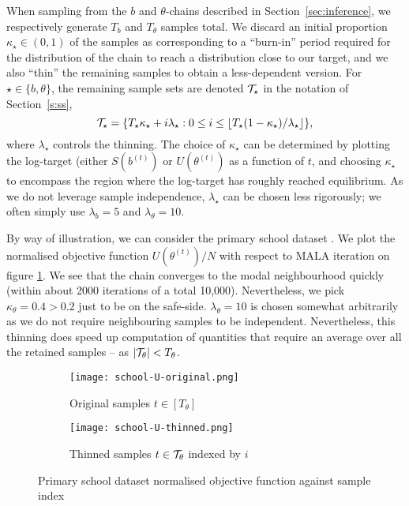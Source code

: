 When sampling from the $b$ and $\theta$-chains described
in Section~\ref{sec:inference}, we respectively generate
$T_b$ and $T_\theta$ samples total.
We discard an initial proportion $\kappa_\star\in(0,1)$ of the samples 
as corresponding to a ``burn-in'' period required for the distribution 
of the chain to reach a distribution close to our target,
and we also ``thin'' the remaining samples to 
obtain a less-dependent version. For $\star\in\{b,\theta\}$,
the remaining sample sets are denoted $\mathcal{T}_\star$
in the notation of Section~\ref{s:ss},
%
\begin{equation}
	\mathcal{T}_\star = \{T_\star \kappa_\star + i \lambda_\star :  
	0 \leq i \leq \lfloor T_\star(1 - \kappa_\star) / \lambda_\star \rfloor \},
\end{equation}
%
where $\lambda_\star$ controls the thinning. The choice of
$\kappa_\star$ can be determined by plotting the log-target (either $S(b^{(t)})$ 
or $U(\theta^{(t)})$ as a function of $t$,
and choosing $\kappa_\star$ to encompass the region where the log-target has 
roughly reached equilibrium. As we do not leverage sample independence,
$\lambda_\star$ can be chosen less rigorously; we often simply
use $\lambda_b=5$ and $\lambda_\theta = 10$.

By way of illustration, we can consider the primary school dataset \cite{schools}. We plot the normalised objective function $U\left( \theta^{(t)} \right) / N$ with respect to MALA iteration on figure \ref{fig:school-U-orginal}. We see that the chain converges to the modal neighbourhood quickly (within about 2000 iterations of a total 10,000). Nevertheless, we pick $\kappa_\theta=0.4 > 0.2$ just to be on the safe-side. $\lambda_\theta=10$ is chosen somewhat arbitrarily as we do not require neighbouring samples to be independent. Nevertheless, this thinning does speed up computation of quantities that require an average over all the retained samples -- as $|\mathcal{T}_\theta| < T_\theta$.
%
\begin{figure}[!h]
	\centering
	\begin{subfigure}[t]{0.4\linewidth}
		\centering
		\texttt{[image: school-U-original.png]}
		\caption{Original samples $t \in [T_\theta]$}
		\label{fig:school-U-orginal}
	\end{subfigure}
	\begin{subfigure}[t]{0.4\linewidth}
		\centering
		\texttt{[image: school-U-thinned.png]}
		\caption{Thinned samples $t \in \mathcal{T}_\theta$ indexed by $i$}
		\label{fig:school-U-thinned}
	\end{subfigure}
	\hspace{1cm}
	\caption{Primary school dataset normalised objective function against sample index}
\end{figure}

